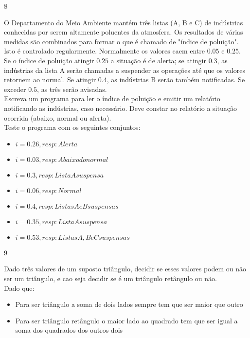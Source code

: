 \begin{exercicio}
  {8}
  {O Departamento do Meio Ambiente mantém três listas (A, B e C) de indústrias conhecidas por serem altamente poluentes da atmosfera. Os resultados de várias medidas são combinados para formar o que é chamado de "índice de poluição". Isto é controlado regularmente. Normalmente os valores caem entre $0.05$ e $0.25$. Se o índice de poluição atingir $0.25$ a situação é de alerta; se atingir $0.3$, as indústrias da lista A serão chamadas a suspender as operações até que os valores retornem ao normal. Se atingir $0.4$, as indústrias B serão também notificadas. Se exceder $0.5$, as três serão avisadas. \\
  Escreva um programa para ler o índice de poluição e emitir um relatório notificando as indústrias, caso necessário. Deve constar no relatório a situação ocorrida (abaixo, normal ou alerta). \\
  Teste o programa com os seguintes conjuntos: \\
  \begin{itemize}
    \item $i = 0.26, resp: Alerta$
    \item $i = 0.03, resp: Abaixo do normal$
    \item $i = 0.3, resp: Lista A suspensa$
    \item $i = 0.06, resp: Normal$
    \item $i = 0.4, resp: Listas A e B suspensas$
    \item $i = 0.35, resp: Lista A suspensa$
    \item $i = 0.53, resp: Listas A, B e C suspensas$
  \end{itemize}}
\end{exercicio}

\begin{exercicio}
  {9}
  {Dado três valores de um suposto triângulo, decidir se esses valores podem ou não ser um triângulo, e cao seja decidir se é um triângulo retângulo ou não. \\
  Dado que: \\
  \begin{itemize}
    \item Para ser triângulo a soma de dois lados sempre tem que ser maior que outro
    \item Para ser triângulo retângulo o maior lado ao quadrado tem que ser igual a soma dos quadrados dos outros dois
  \end{itemize}}
\end{exercicio}

